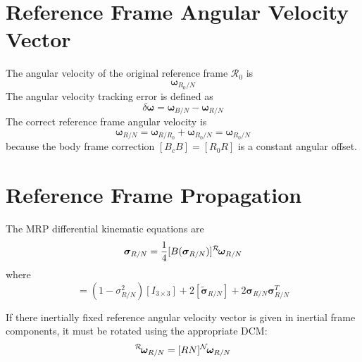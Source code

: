 \documentclass[]{AVSSimReportMemo}
\begin{document}
\section{Reference Frame Angular Velocity Vector}
The angular velocity of the original reference frame $\mathcal{R}_{0}$ is
\begin{equation}
	\bm\omega_{R_{0}/N}
\end{equation}
The angular velocity tracking error is defined as
\begin{equation}
	\delta\bm\omega = \bm\omega_{B/N} - \bm\omega_{R/N}
\end{equation}
The correct reference frame angular velocity is
\begin{equation}
	\bm\omega_{R/N} = \bm\omega_{R/R_{0}} + \bm\omega_{R_{0}/N} =  \bm\omega_{R_{0}/N} 
\end{equation}
because the body frame correction $[B_{c} B] = [R_{0}R]$ is a constant angular offset.  



\section{Reference Frame Propagation}
The MRP differential kinematic equations are
\begin{equation}
	\bm\sigma_{R/N} = \frac{1}{4} [B(\bm\sigma_{R/N})] \leftexp{R}{\bm\omega}_{R/N}
\end{equation}
where
\begin{equation}
	[B(\bm\sigma_{R/N})] = (1-\sigma_{R/N}^{2}) [I_{3\times 3}] + 2 [\tilde{\bm\sigma}_{R/N}] + 2 \bm\sigma_{R/N} \bm\sigma_{R/N}^{T}
\end{equation}

If there inertially fixed reference angular velocity vector is given in inertial frame components, it must be rotated using the appropriate DCM:
\begin{equation}
	\leftexp{R}{\bm\omega_{R/N}} = [RN] \leftexp{N}{\bm\omega_{R/N}}
\end{equation}



\end{document}
